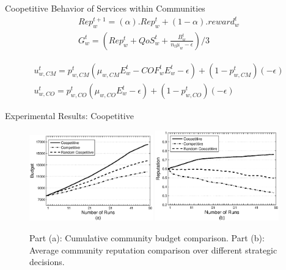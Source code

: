 \documentclass{beamer}
\begin{document}
\begin{frame}{Coopetitive Behavior of Services within Communities}
    \vspace{0.00cm}
    \begin{gather*}\label{eq:repreprowthfactor}
        Rep_{w}^{t+1} = (\alpha).Rep_{w}^{t} + (1-\alpha).reward_{w}^{t} \\
        G^t_w = (Rep^t_w + QoS_w^t+\frac{B_w^t}{n_t \mu_w - \epsilon})/3
    \end{gather*}
    
    \vspace{0.00cm}
    \begin{gather*}\label{CMPff}
      u_{w,CM}^t=p_{w,CM}^t(\mu_{w, CM}E^t_w-COF_w^t E^t_w-\epsilon)+(1-p_{w,CM}^t)(-\epsilon) \\
      u_{w,CO}^t=p_{w,CO}^t (\mu_{w,CO}E^t_w-\epsilon)+(1-p_{w,CO}^t)(-\epsilon)
    \end{gather*}
    

\end{frame}


\begin{frame}{Experimental Results: Coopetitive}
    \begin{figure}%
        \includegraphics[width=2.1in]{figures/graphbgtmed.eps}
        \includegraphics[width=2.1in]{figures/graphrep.eps}
        \caption{Part (a): Cumulative community budget comparison. Part
        (b): Average community reputation comparison over different
        strategic decisions.} \label{Graph1}
    \end{figure}
\end{frame}
\end{document}
